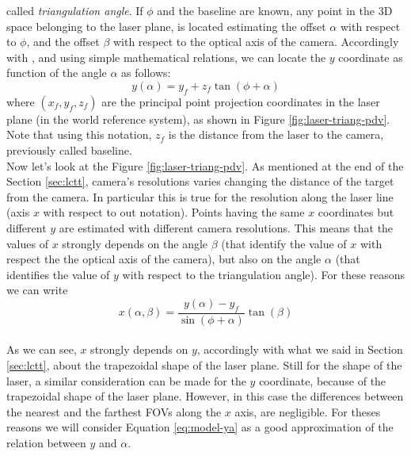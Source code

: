 \clearpage \noindent
called \textit{triangulation angle}. If $\phi$ and the baseline are known, any point in the 3D space belonging to the laser plane, is located estimating the offset $\alpha$ with respect to $\phi$, and the offset $\beta$ with respect to the optical axis of the camera. Accordingly with \cite{th:quattrini}, and using simple mathematical relations, we can locate the $y$ coordinate as function of the angle $\alpha$ as follows:
  \begin{equation}
    \label{eq:model-ya}
    y\left( \alpha \right) = y_f + z_f \tan \left( \phi + \alpha \right)
  \end{equation}
where $\left( x_f, y_f, z_f \right)$ are the principal point projection coordinates in the laser plane (in the world reference system), as shown in Figure \ref{fig:laser-triang-pdv}. Note that using this notation, $z_f$ is the distance from the laser to the camera, previously called baseline. \\

Now let's look at the Figure \ref{fig:laser-triang-pdv}. As mentioned at the end of the Section \ref{sec:lctt}, camera's resolutions varies changing the distance of the target from the camera. In particular this is true for the resolution along the laser line (axis $x$ with respect to out notation). Points having the same $x$ coordinates but different $y$ are estimated with different camera resolutions. This means that the values of $x$ strongly depends on the angle $\beta$ (that identify the value of $x$ with respect the the optical axis of the camera), but also on the angle $\alpha$ (that identifies the value of $y$ with respect to the triangulation angle). For these reasons we can write
  \begin{equation}
  \label{eq:model-xab}
    x(\alpha, \beta) = \frac{y\left( \alpha \right) - y_f}{\sin(\phi + \alpha)}\tan(\beta)
  \end{equation} \\
As we can see, $x$ strongly depends on $y$, accordingly with what we said in Section \ref{sec:lctt}, about the trapezoidal shape of the laser plane. Still for the shape of the laser, a similar consideration can be made for the $y$ coordinate, because of the trapezoidal shape of the laser plane.
However, in this case the differences between the nearest and the farthest \acs{FOV}s along the $x$ axis, are negligible. For theses reasons we will consider Equation \ref{eq:model-ya} as a good approximation of the relation between $y$ and $\alpha$. \\


